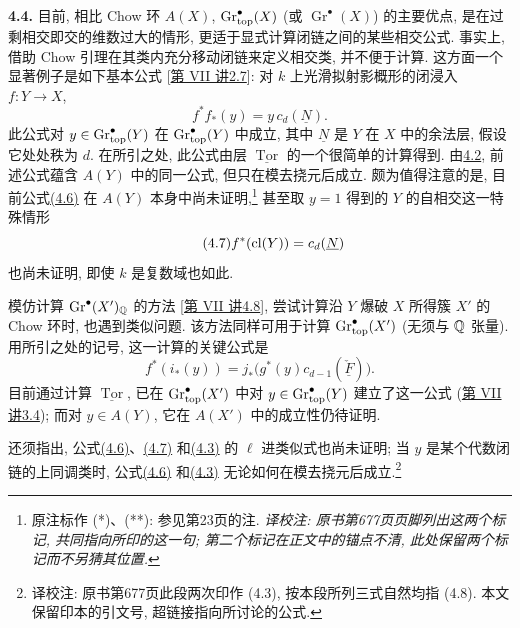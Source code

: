 \noindent{}\textbf{4.4.}
目前, 相比 Chow 环 $A(X)$, $\operatorname{Gr}_{\mathrm{top}}^\bullet(X)$ (或 $\operatorname{Gr}^\bullet(X)$) 的主要优点, 是在过剩相交即交的维数过大的情形, 更适于显式计算闭链之间的某些相交公式. 事实上, 借助 Chow 引理在其类内充分移动闭链来定义相交类, 并不便于计算. 这方面一个显著例子是如下基本公式 [\hyperlink{sga6.e07.expose}{第 VII 讲}\hyperlink{sga6.e07.prop.2-7}{2.7}]: 对 $k$ 上光滑拟射影概形的闭浸入 $f:Y\to X$,
\begin{equation*}\tag{4.6}
 f^*f_*(y)=y\,c_d(\underline{N}).
\end{equation*}
此公式对 $y\in\operatorname{Gr}_{\mathrm{top}}^\bullet(Y)$ 在 $\operatorname{Gr}_{\mathrm{top}}^\bullet(Y)$ 中成立, 其中 $\underline{N}$ 是 $Y$ 在 $X$ 中的余法层, 假设它处处秩为 $d$. 在所引之处, 此公式由层 $\underline{\operatorname{Tor}}$ 的一个很简单的计算得到. 由\hyperlink{sga6.e14.para.4-2}{4.2}, 前述公式蕴含 $A(Y)$ 中的同一公式, 但只在模去挠元后成立. 颇为值得注意的是, 目前公式\hyperlink{sga6.e14.eq.4-6}{(4.6)} 在 $A(Y)$ 本身中尚未证明,\footnote{原注标作 (*)、(**): 参见第23页的注. \emph{译校注: 原书第677页页脚列出这两个标记, 共同指向所印的这一句; 第二个标记在正文中的锚点不清, 此处保留两个标记而不另猜其位置.}} 甚至取 $y=1$ 得到的 $Y$ 的自相交这一特殊情形
\begin{equation*}\tag{4.7}
 f^*(\operatorname{cl}(Y))=c_d(\underline{N})
\end{equation*}
也尚未证明, 即使 $k$ 是复数域也如此.

模仿计算 $\operatorname{Gr}^\bullet(X')_{\mathbb Q}$ 的方法 [\hyperlink{sga6.e07.expose}{第 VII 讲}\hyperlink{sga6.e07.thm.4-8}{4.8}], 尝试计算沿 $Y$ 爆破 $X$ 所得簇 $X'$ 的 Chow 环时, 也遇到类似问题. 该方法同样可用于计算 $\operatorname{Gr}_{\mathrm{top}}^\bullet(X')$ (无须与 $\mathbb Q$ 张量). 用所引之处的记号, 这一计算的关键公式是
\begin{equation*}\tag{4.8}
 f^*(i_*(y))
   =j_*\bigl(g^*(y)c_{d-1}(\check{\underline{F}})\bigr).
\end{equation*}
目前通过计算 $\underline{\operatorname{Tor}}$, 已在 $\operatorname{Gr}_{\mathrm{top}}^\bullet(X')$ 中对 $y\in\operatorname{Gr}_{\mathrm{top}}^\bullet(Y)$ 建立了这一公式 (\hyperlink{sga6.e07.expose}{第 VII 讲}\hyperlink{sga6.e07.prop.3-4}{3.4}); 而对 $y\in A(Y)$, 它在 $A(X')$ 中的成立性仍待证明.

还须指出, 公式\hyperlink{sga6.e14.eq.4-6}{(4.6)}、\hyperlink{sga6.e14.eq.4-7}{(4.7)} 和\hyperlink{sga6.e14.eq.4-8}{(4.3)} 的 $\ell$ 进类似式也尚未证明; 当 $y$ 是某个代数闭链的上同调类时, 公式\hyperlink{sga6.e14.eq.4-6}{(4.6)} 和\hyperlink{sga6.e14.eq.4-8}{(4.3)} 无论如何在模去挠元后成立.\footnote{译校注: 原书第677页此段两次印作 (4.3), 按本段所列三式自然均指 (4.8). 本文保留印本的引文号, 超链接指向所讨论的公式.}

